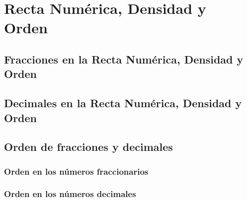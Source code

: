 \thispagestyle{plain}

\section{Recta Num\'erica, Densidad y Orden}
\subsection{Fracciones en la Recta Num\'erica, Densidad y Orden}
\subsection{Decimales en la Recta Num\'erica, Densidad y Orden}
\subsection{Orden de fracciones y decimales}
\subsubsection{Orden en los n\'umeros fraccionarios}
\subsubsection{Orden en los n\'umeros decimales}


\newpage